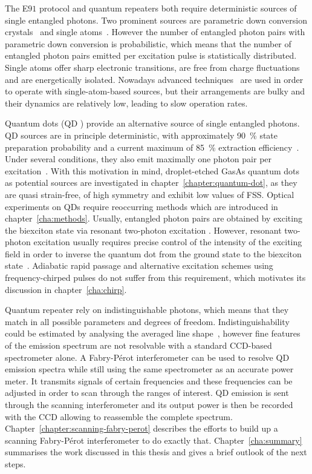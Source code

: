 The E$91$ protocol and quantum repeaters both require deterministic sources of single entangled photons.
Two prominent sources are parametric down conversion crystals~\cite{shih_new_1988} and single atoms~\cite{norden_entangled_2018}\cite{aspect_experimental_1981}.
However the number of entangled photon pairs with parametric down conversion is probabilistic, which means that the number of entangled photon pairs emitted per excitation pulse is statistically distributed.
Single atoms offer sharp electronic transitions, are free from charge fluctuations and are energetically isolated.
Nowadays advanced techniques~\cite{kuhn_deterministic_2002} are used in order to operate with single-atom-based sources, but their arrangements are bulky and their dynamics are relatively low, leading to slow operation rates.

Quantum dots (\ac{QD} ) provide an alternative source of single entangled photons.
\ac{QD} sources are in principle deterministic, with approximately \SI{90}{\percent} state preparation probability and a current maximum of \SI{85}{\percent} extraction efficiency~\cite{liu_solid-state_2019}.
Under several conditions, they also emit maximally one photon pair per excitation~\cite{schweickert_-demand_2018}.
With this motivation in mind, droplet-etched GasAs quantum dots as potential sources are investigated in chapter~\ref{chapter:quantum-dot}, as they are quasi strain-free, of high symmetry and exhibit low values of \ac{FSS}.
Optical experiments on \acp{QD} require reoccurring methods which are introduced in chapter~\ref{cha:methods}. 
Usually, entangled photon pairs are obtained by exciting the biexciton state via resonant two-photon excitation .
However, resonant two-photon excitation usually requires precise control of the intensity of the exciting field in order to inverse the quantum dot from the ground state to the biexciton state~\cite{jayakumar_deterministic_2013}.
Adiabatic rapid passage and alternative excitation schemes using frequency-chirped pulses do not suffer from this requirement, which motivates its discussion in chapter~\ref{cha:chirp}.

Quantum repeater rely on indistinguishable photons, which means that they match in all possible parameters and degrees of freedom.
Indistinguishability could be estimated by analysing the averaged line shape~\cite{reindl_all-photonic_2018}, however fine features of the emission spectrum are not resolvable with a standard CCD-based spectrometer alone.
A Fabry-Pérot interferometer can be used to resolve \ac{QD} emission spectra while still using the same spectrometer as an accurate power meter.
It transmits signals of certain frequencies and these frequencies can be adjusted in order to scan through the ranges of interest.
\ac{QD} emission is sent through the scanning interferometer and its output power is then be recorded with the CCD allowing to reassemble the complete spectrum.
Chapter~\ref{chapter:scanning-fabry-perot} describes the efforts to build up a scanning Fabry-Pérot interferometer to do exactly that.
Chapter~\ref{cha:summary} summarises the work discussed in this thesis and gives a brief outlook of the next steps.

